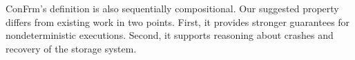 ConFrm’s definition is also sequentially compositional. Our suggested property differs from existing work in two points. First, it provides stronger guarantees for nondeterministic executions. Second, it supports reasoning about crashes and recovery of the storage system. 


	
	
	
	

